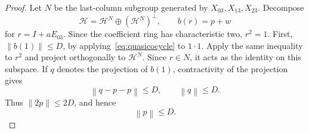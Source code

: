 \documentclass[11pt]{amsart}
\theoremstyle{definition}
\theoremstyle{plain}
\newcommand{\norm}[1]{\left\lVert#1\right\rVert}
\begin{document}
\begin{proof}
Let \(N\) be the last-column subgroup generated by
\(X_{03},X_{13},X_{23}\).  Decompose
\[
  \mathcal H=\mathcal H^N\oplus(\mathcal H^N)^\perp,
  \qquad b(r)=p+w
\]
for \(r=I+aE_{03}\).  Since the coefficient ring has
characteristic two, \(r^2=1\).
First, \(\norm{b(1)}\le D\), by applying~\eqref{eq:quasicocycle}
to \(1\cdot1\).  Apply the same inequality to \(r^2\) and project
orthogonally to \(\mathcal H^N\).  Since \(r\in N\), it acts as the
identity on this subspace.  If \(q\) denotes the projection of
\(b(1)\), contractivity of the projection gives
\[
  \norm{q-p-p}\le D,
  \qquad \norm q\le D.
\]
Thus \(\norm{2p}\le2D\), and hence
\begin{equation}\label{eq:fixed}
  \norm p\le D.
\end{equation}


\end{proof}
\end{document}
